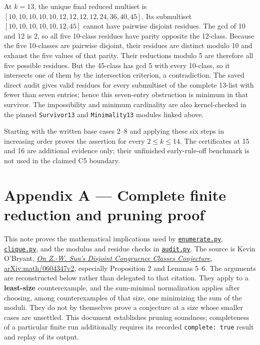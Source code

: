 \documentclass[11pt,a4paper]{article}
\begin{document}
At \(k=13\), the unique final reduced multiset is \([10,10,10,10,10,12,12,12,12,24,36,40,45]\). Its submultiset \([10,10,10,10,10,12,45]\) cannot have pairwise disjoint residues. The gcd of 10 and 12 is 2, so all five 10-class residues have parity opposite the 12-class. Because the five 10-classes are pairwise disjoint, their residues are distinct modulo 10 and exhaust the five values of that parity. Their reductions modulo 5 are therefore all five possible residues. But the 45-class has gcd 5 with every 10-class, so it intersects one of them by the intersection criterion, a contradiction. The saved direct audit gives valid residues for every submultiset of the complete 13-list with fewer than seven entries; hence this seven-entry obstruction is minimum in that survivor. The impossibility and minimum cardinality are also kernel-checked in the pinned \texttt{Survivor13} and \texttt{Minimality13} modules linked above.

Starting with the written base cases 2--8 and applying these six steps in increasing order proves the assertion for every \(2\le k\le14\). The certificates at 15 and 16 are additional evidence only; their unfinished early-rule-off benchmark is not used in the claimed C5 boundary.

\section{Appendix A --- Complete finite reduction and pruning proof}\label{appendix-a-complete-finite-reduction-and-pruning-proof}

This note proves the mathematical implications used by \href{https://github.com/mpelteshki/climbing-to-the-frontier/blob/ed55f76eb8c558825bb629fd2cd8dbf46e5f1314/cagent/p4/audit/enumerate.py}{\texttt{enumerate.py}}, \href{https://github.com/mpelteshki/climbing-to-the-frontier/blob/ed55f76eb8c558825bb629fd2cd8dbf46e5f1314/cagent/p4/audit/clique.py}{\texttt{clique.py}}, and the modulus and residue checks in \href{https://github.com/mpelteshki/climbing-to-the-frontier/blob/ed55f76eb8c558825bb629fd2cd8dbf46e5f1314/cagent/p4/audit/audit.py}{\texttt{audit.py}}. The source is Kevin O'Bryant, \href{https://arxiv.org/pdf/math/0604347v2}{\emph{On Z.-W. Sun's Disjoint Congruence Classes Conjecture}, arXiv:math/0604347v2}, especially Proposition 2 and Lemmas 5--6. The arguments are reconstructed below rather than delegated to that citation. They apply to a \textbf{least-size} counterexample, and the sum-minimal normalization applies after choosing, among counterexamples of that size, one minimizing the sum of the moduli. They do not by themselves prove a conjecture at a size whose smaller cases are unsettled. This document establishes pruning soundness; completeness of a particular finite run additionally requires its recorded \texttt{complete:\ true} result and replay of its output.
\end{document}
